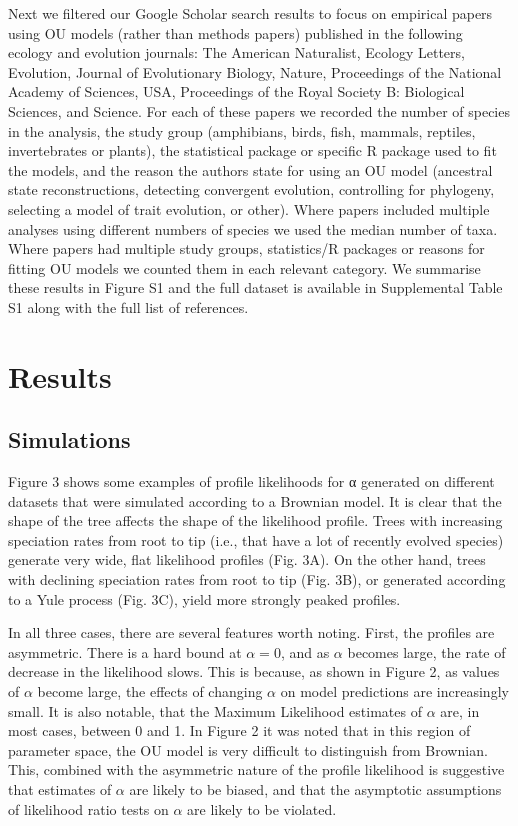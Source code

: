 \documentclass[a4paper,12pt]{article}
\begin{document}
Next we filtered our Google Scholar search results to focus on empirical papers using OU models (rather than methods papers) published in the following ecology and evolution journals: The American Naturalist, Ecology Letters, Evolution, Journal of Evolutionary Biology, Nature, Proceedings of the National Academy of Sciences, USA, Proceedings of the Royal Society B: Biological Sciences, and Science. For each of these papers we recorded the number of species in the analysis, the study group (amphibians, birds, fish, mammals, reptiles, invertebrates or plants), the statistical package or specific R package used to fit the models, and the reason the authors state for using an OU model (ancestral state reconstructions, detecting convergent evolution, controlling for phylogeny, selecting a model of trait evolution, or other). Where papers included multiple analyses using different numbers of species we used the median number of taxa. Where papers had multiple study groups, statistics/R packages or reasons for fitting OU models we counted them in each relevant category. We summarise these results in Figure S1 and the full dataset is available in Supplemental Table S1 along with the full list of references.

\section{Results}
\subsection{Simulations}
\label{section:sims.results} 
Figure 3 shows some examples of profile likelihoods for α generated on different datasets that were simulated according to a Brownian model. It is clear that the shape of the tree affects the shape of the likelihood profile. Trees with increasing speciation rates from root to tip (i.e., that have a lot of recently evolved species) generate very wide, flat likelihood profiles (Fig. 3A). On the other hand, trees with declining speciation rates from root to tip (Fig. 3B), or generated according to a Yule process (Fig. 3C), yield more strongly peaked profiles. 

In all three cases, there are several features worth noting. First, the profiles are asymmetric. There is a hard bound at $\alpha = 0$, and as $\alpha$ becomes large, the rate of decrease in the likelihood slows. This is because, as shown in Figure 2, as values of $\alpha$ become large, the effects of changing $\alpha$ on model predictions are increasingly small. It is also notable, that the Maximum Likelihood estimates of $\alpha$ are, in most cases, between 0 and 1. In Figure 2 it was noted that in this region of parameter space, the OU model is very difficult to distinguish from Brownian. This, combined with the asymmetric nature of the profile likelihood is suggestive that estimates of $\alpha$ are likely to be biased, and that the asymptotic assumptions of likelihood ratio tests on $\alpha$ are likely to be violated.
\end{document}
